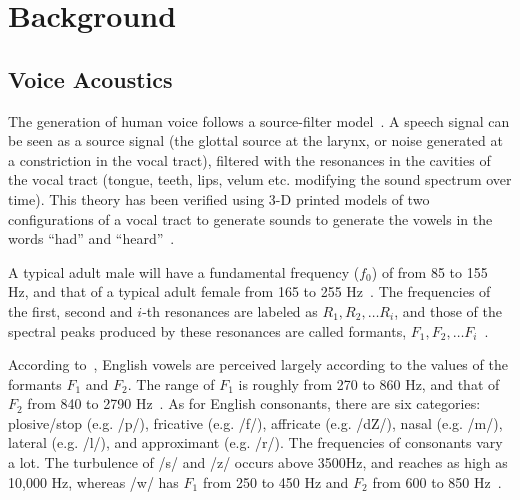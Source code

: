 \section{Background}

\subsection{Voice Acoustics}\label{sec:voice}

The generation of human voice follows a source-filter model~\cite{fant1960acoustic}. A speech signal can be seen as a source signal (the glottal source at the larynx, or noise generated at a constriction in the vocal tract), filtered with the resonances in the cavities of the vocal tract (tongue, teeth, lips, velum etc. modifying the sound spectrum over time). This theory has been verified using 3-D printed models of two configurations of a vocal tract to generate sounds to generate the vowels in the words ``had'' and ``heard''~\cite{wolfe2016experimentally}. 

A typical adult male will have a fundamental frequency  ($f_0$) of from 85 to 155 Hz, and that of a typical adult female from 165 to 255 Hz~\cite{baken1987clinical,titze1994principles}. The frequencies of the first, second and $i$-th resonances are labeled as  $R_1, R_2, \ldots R_i$, and those of the spectral peaks produced by these resonances are called formants, $F_1, F_2, \ldots F_i $~\cite{titze2015toward}. 

According to~\cite{ladefoged2014course}, English vowels are perceived largely according to the values of the formants $F_1$ and $F_2$. The range of $F_1$ is roughly from 270 to 860 Hz, and that of $F_2$ from 840 to 2790 Hz~\cite{peterson1952control}. As for English consonants, there are six categories: plosive/stop (e.g. /p/), fricative (e.g. /f/), affricate (e.g. /dZ/), nasal (e.g. /m/), lateral (e.g. /l/), and approximant (e.g. /r/). The frequencies of consonants vary a lot. The turbulence of /s/ and /z/ occurs above 3500Hz, and reaches as high as 10,000 Hz, whereas /w/ has $F_1$ from 250 to 450 Hz and $F_2 $ from 600 to 850 Hz~\cite{ladefoged2012vowels}. 


